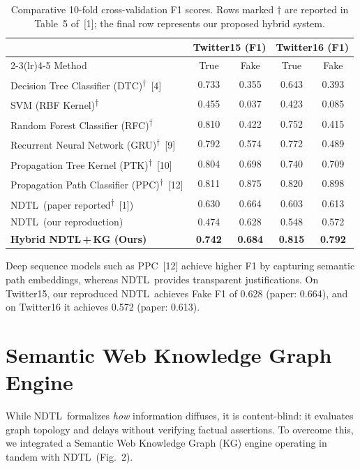 \documentclass[10pt,twocolumn,a4paper]{article}
\newcommand{\NDTL}{\textsc{NDTL}}
\begin{document}
\begin{table}[t]
\centering
\caption{Comparative 10-fold cross-validation F1 scores. Rows marked $\dagger$ are reported in Table~5 of~[1]; the final row represents our proposed hybrid system.}
\label{tab:base}
\small
\begin{tabular}{lcccc}
\toprule
 & \multicolumn{2}{c}{Twitter15 (F1)} & \multicolumn{2}{c}{Twitter16 (F1)}\\
\cmidrule(lr){2-3}\cmidrule(lr){4-5}
Method & True & Fake & True & Fake\\
\midrule
Decision Tree Classifier (DTC)\textsuperscript{$\dagger$}~[4] & 0.733 & 0.355 & 0.643 & 0.393\\
SVM (RBF Kernel)\textsuperscript{$\dagger$} & 0.455 & 0.037 & 0.423 & 0.085\\
Random Forest Classifier (RFC)\textsuperscript{$\dagger$} & 0.810 & 0.422 & 0.752 & 0.415\\
Recurrent Neural Network (GRU)\textsuperscript{$\dagger$}~[9] & 0.792 & 0.574 & 0.772 & 0.489\\
Propagation Tree Kernel (PTK)\textsuperscript{$\dagger$}~[10] & 0.804 & 0.698 & 0.740 & 0.709\\
Propagation Path Classifier (PPC)\textsuperscript{$\dagger$}~[12] & 0.811 & 0.875 & 0.820 & 0.898\\
\NDTL\ (paper reported\textsuperscript{$\dagger$}~[1]) & 0.630 & 0.664 & 0.603 & 0.613\\
\NDTL\ (our reproduction) & 0.474 & 0.628 & 0.548 & 0.572\\
\textbf{Hybrid NDTL\,+\,KG (Ours)} & \textbf{0.742} & \textbf{0.684} & \textbf{0.815} & \textbf{0.792}\\
\bottomrule
\end{tabular}
\end{table}
 
Deep sequence models such as PPC~[12] achieve higher F1 by capturing semantic path embeddings, whereas \NDTL\ provides transparent justifications. On Twitter15, our reproduced \NDTL\ achieves Fake F1 of 0.628 (paper: 0.664), and on Twitter16 it achieves 0.572 (paper: 0.613).
 
\section{Semantic Web Knowledge Graph Engine}
While \NDTL\ formalizes \emph{how} information diffuses, it is content-blind: it evaluates graph topology and delays without verifying factual assertions. To overcome this, we integrated a Semantic Web Knowledge Graph (KG) engine operating in tandem with \NDTL\ (Fig.~2).
 
\end{document}
